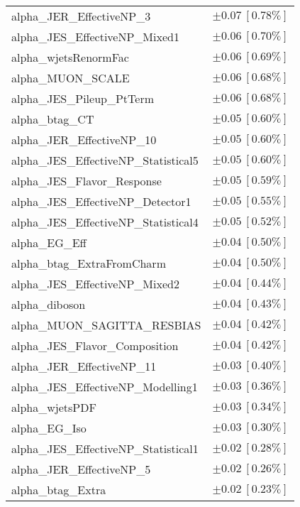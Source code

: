 \begin{table}
\begin{center}
\begin{tabular*}{\textwidth}{@{\extracolsep{\fill}}lc}
alpha\_JER\_EffectiveNP\_3         & $\pm 0.07\ [0.78\%] $       \\
alpha\_JES\_EffectiveNP\_Mixed1         & $\pm 0.06\ [0.70\%] $       \\
alpha\_wjetsRenormFac         & $\pm 0.06\ [0.69\%] $       \\
alpha\_MUON\_SCALE         & $\pm 0.06\ [0.68\%] $       \\
alpha\_JES\_Pileup\_PtTerm         & $\pm 0.06\ [0.68\%] $       \\
alpha\_btag\_CT         & $\pm 0.05\ [0.60\%] $       \\
alpha\_JER\_EffectiveNP\_10         & $\pm 0.05\ [0.60\%] $       \\
alpha\_JES\_EffectiveNP\_Statistical5         & $\pm 0.05\ [0.60\%] $       \\
alpha\_JES\_Flavor\_Response         & $\pm 0.05\ [0.59\%] $       \\
alpha\_JES\_EffectiveNP\_Detector1         & $\pm 0.05\ [0.55\%] $       \\
alpha\_JES\_EffectiveNP\_Statistical4         & $\pm 0.05\ [0.52\%] $       \\
alpha\_EG\_Eff         & $\pm 0.04\ [0.50\%] $       \\
alpha\_btag\_ExtraFromCharm         & $\pm 0.04\ [0.50\%] $       \\
alpha\_JES\_EffectiveNP\_Mixed2         & $\pm 0.04\ [0.44\%] $       \\
alpha\_diboson         & $\pm 0.04\ [0.43\%] $       \\
alpha\_MUON\_SAGITTA\_RESBIAS         & $\pm 0.04\ [0.42\%] $       \\
alpha\_JES\_Flavor\_Composition         & $\pm 0.04\ [0.42\%] $       \\
alpha\_JER\_EffectiveNP\_11         & $\pm 0.03\ [0.40\%] $       \\
alpha\_JES\_EffectiveNP\_Modelling1         & $\pm 0.03\ [0.36\%] $       \\
alpha\_wjetsPDF         & $\pm 0.03\ [0.34\%] $       \\
alpha\_EG\_Iso         & $\pm 0.03\ [0.30\%] $       \\
alpha\_JES\_EffectiveNP\_Statistical1         & $\pm 0.02\ [0.28\%] $       \\
alpha\_JER\_EffectiveNP\_5         & $\pm 0.02\ [0.26\%] $       \\
alpha\_btag\_Extra         & $\pm 0.02\ [0.23\%] $       \\

\end{tabular*}
\end{center}
\end{table}

